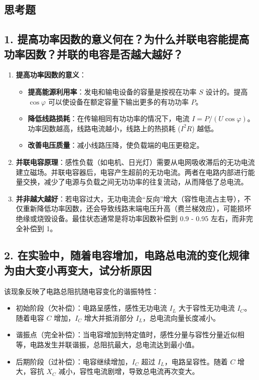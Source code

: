 \documentclass[]{../../templates/Report}%
\begin{document}
\begin{fullreportonly}
    \section{思考题}

    \subsection*{1. 提高功率因数的意义何在？为什么并联电容能提高功率因数？并联的电容是否越大越好？}
    \begin{enumerate}
        \item \textbf{提高功率因数的意义}：
              \begin{itemize}
                  \item \textbf{提高能源利用率}：发电和输电设备的容量是按视在功率 $S$ 设计的。提高 $\cos\varphi$ 可以使设备在额定容量下输出更多的有功功率 $P$。
                  \item \textbf{降低线路损耗}：在传输相同有功功率的情况下，电流 $I = P/(U\cos\varphi)$。功率因数越高，线路电流越小，线路上的热损耗 ($I^2R$) 越低。
                  \item \textbf{改善电压质量}：减小线路压降，使负载端的电压更稳定。
              \end{itemize}
        \item \textbf{并联电容原理}：感性负载（如电机、日光灯）需要从电网吸收滞后的无功电流建立磁场。并联电容器后，电容产生超前的无功电流。两者在电路内部进行能量交换，减少了电源与负载之间无功功率的往复流动，从而降低了总电流。
        \item \textbf{并非越大越好}：若电容过大，无功电流会“反向”增大（容性电流占主导），不仅重新降低功率因数，还会导致线路末端电压升高（费兰梯效应），可能损坏绝缘或烧毁设备。最佳状态通常是将功率因数补偿到 0.9 - 0.95 左右，而非完全补偿到 1。
    \end{enumerate}

    \subsection*{2. 在实验中，随着电容增加，电路总电流的变化规律为由大变小再变大，试分析原因}
    该现象反映了电路总阻抗随电容变化的谐振特性：
    \begin{itemize}
        \item 初始阶段（欠补偿）：电路呈感性，感性无功电流 $I_L$ 大于容性无功电流 $I_C$。随着电容 $C$ 增加，$I_C$ 增大并抵消部分 $I_L$，总电流向量长度减小。
        \item 谐振点（完全补偿）：当电容增加到特定值时，感性分量与容性分量近似相等，电路发生并联谐振，总阻抗最大，总电流达到最小值。
        \item 后期阶段（过补偿）：电容继续增加，$I_C$ 超过 $I_L$，电路呈容性。随着 $C$ 增大，容抗 $X_C$ 减小，容性电流剧增，导致总电流再次变大。
    \end{itemize}


\end{fullreportonly}
\end{document}
